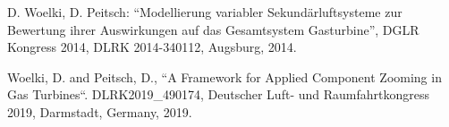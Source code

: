 \begin{thebibliography}{laengste Breite}

	 D. Woelki, D. Peitsch: ``Modellierung variabler Sekund\"arluftsysteme zur Bewertung ihrer Auswirkungen auf das Gesamtsystem Gasturbine'', DGLR Kongress 2014, DLRK 2014-340112, Augsburg, 2014.

Woelki, D. and Peitsch, D.,
\newblock ``A Framework for Applied Component Zooming in Gas Turbines``.
\newblock DLRK2019\_490174, Deutscher Luft- und Raumfahrtkongress 2019, Darmstadt, Germany, 2019.

	
\end{thebibliography}
